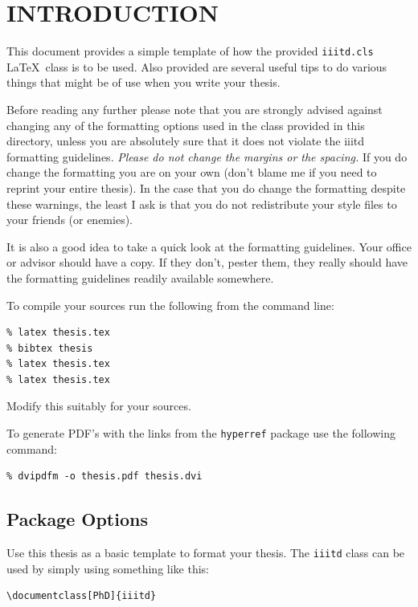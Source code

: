 \documentclass[PhD]{iiitd}
\begin{document}
\pagebreak
\clearpage




\chapter{INTRODUCTION}
\label{chap:intro}

This document provides a simple template of how the provided
\verb+iiitd.cls+ \LaTeX\ class is to be used.  Also provided are
several useful tips to do various things that might be of use when you
write your thesis.

Before reading any further please note that you are strongly advised
against changing any of the formatting options used in the class
provided in this directory, unless you are absolutely sure that it
does not violate the iiitd formatting guidelines.  \emph{Please do not
  change the margins or the spacing.}  If you do change the formatting
you are on your own (don't blame me if you need to reprint your entire
thesis).  In the case that you do change the formatting despite these
warnings, the least I ask is that you do not redistribute your style
files to your friends (or enemies).

It is also a good idea to take a quick look at the formatting
guidelines.  Your office or advisor should have a copy.  If they
don't, pester them, they really should have the formatting guidelines
readily available somewhere.

To compile your sources run the following from the command line:
\begin{verbatim}
% latex thesis.tex
% bibtex thesis
% latex thesis.tex
% latex thesis.tex
\end{verbatim}
Modify this suitably for your sources.

To generate PDF's with the links from the \verb+hyperref+ package use
the following command:
\begin{verbatim}
% dvipdfm -o thesis.pdf thesis.dvi
\end{verbatim}

\section{Package Options}

Use this thesis as a basic template to format your thesis.  The
\verb+iiitd+ class can be used by simply using something like this:
\begin{verbatim}
\documentclass[PhD]{iiitd}  
\end{verbatim}
\end{document}
